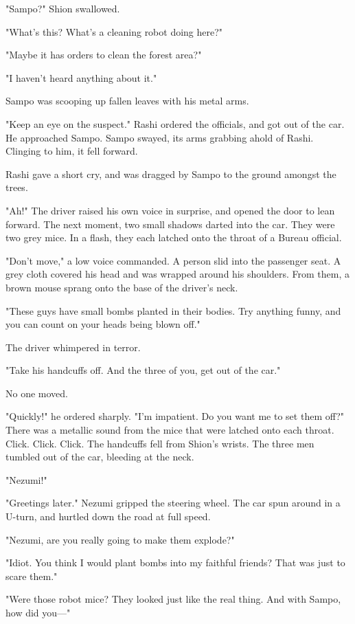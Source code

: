 "Sampo?" Shion swallowed.

"What's this? What's a cleaning robot doing here?"

"Maybe it has orders to clean the forest area?"

"I haven't heard anything about it."

Sampo was scooping up fallen leaves with his metal arms.

"Keep an eye on the suspect." Rashi ordered the officials, and got out
of the car. He approached Sampo. Sampo swayed, its arms grabbing ahold
of Rashi. Clinging to him, it fell forward.

Rashi gave a short cry, and was dragged by Sampo to the ground amongst
the trees.

"Ah!" The driver raised his own voice in surprise, and opened the door
to lean forward. The next moment, two small shadows darted into the car.
They were two grey mice. In a flash, they each latched onto the throat
of a Bureau official.

"Don't move," a low voice commanded. A person slid into the passenger
seat. A grey cloth covered his head and was wrapped around his
shoulders. From them, a brown mouse sprang onto the base of the driver's
neck.

"These guys have small bombs planted in their bodies. Try anything
funny, and you can count on your heads being blown off."

The driver whimpered in terror.

"Take his handcuffs off. And the three of you, get out of the car."

No one moved.

"Quickly!" he ordered sharply. "I'm impatient. Do you want me to set
them off?" There was a metallic sound from the mice that were latched
onto each throat. Click. Click. Click. The handcuffs fell from Shion's
wrists. The three men tumbled out of the car, bleeding at the neck.

"Nezumi!"

"Greetings later." Nezumi gripped the steering wheel. The car spun
around in a U-turn, and hurtled down the road at full speed.

"Nezumi, are you really going to make them explode?"

"Idiot. You think I would plant bombs into my faithful friends? That was
just to scare them."

"Were those robot mice? They looked just like the real thing. And with
Sampo, how did you---"


